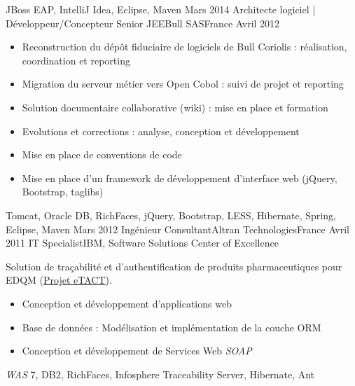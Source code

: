 \begin{experiences}
{\begin{itemize}
                      \end{itemize}
                    }
                    {JBoss EAP, IntelliJ Idea, Eclipse, Maven}
  \emptySeparator
  \experience
    {Mars 2014}     {Architecte logiciel | Développeur/Concepteur Senior JEE}{Bull SAS}{France}
    {Avril 2012}    {
                      \begin{itemize}
                        \item Reconstruction du dépôt fiduciaire de logiciels de Bull Coriolis : réalisation, coordination et reporting
                        \item Migration du serveur métier vers Open Cobol : suivi de projet et reporting                
                        \item Solution documentaire collaborative (wiki) : mise en place et formation                   
                        \item Evolutions et corrections : analyse, conception et développement                          
                        \item Mise en place de conventions de code                                                      
                        \item Mise en place d'un framework de développement d'interface web (jQuery, Bootstrap, taglibs)
                      \end{itemize}
                    }
                    {Tomcat, Oracle DB, RichFaces, jQuery, Bootstrap, LESS, Hibernate, Spring, Eclipse, Maven}
  \emptySeparator
  \consultantexperience
  {Mars 2012}       {Ingénieur Consultant}{Altran Technologies}{France}
  {Avril 2011}      {IT Specialist}{IBM, Software Solutions Center of Excellence}
                    {
                      Solution de traçabilité et d'authentification de produits pharmaceutiques pour EDQM (\href{https://www.edqm.eu/fr/eTACT-1466.html}{Projet eTACT}).
                      \begin{itemize}
                        \item Conception et développement d'applications web                               
                        \item Base de données : Modélisation et implémentation de la couche ORM            
                        \item Conception et développement de Services Web \emph{SOAP}                      
                      \end{itemize}
                    }
                    {\emph{WAS} 7, DB2, RichFaces, Infosphere Traceability Server, Hibernate, Ant}

\end{experiences}
